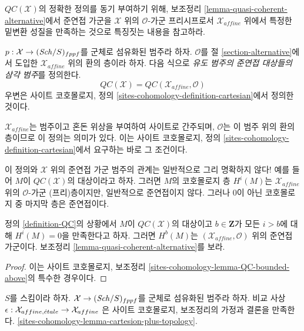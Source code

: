 \medskip\noindent
 $\mathit{QC}(\mathcal{X})$의 정확한 정의를 동기 부여하기 위해,
보조정리 \ref{lemma-quasi-coherent-alternative}에서 준연접 가군을
$\mathcal{X}$ 위의 $\mathcal{O}$-가군 프리시프로서 $\mathcal{X}_{affine}$
위에서 특정한 밑변환 성질을 만족하는 것으로 특징짓는 내용을 참고하라.

\begin{definition}
\label{definition-QC}
$p : \mathcal{X} \to (\mathit{Sch}/S)_{fppf}$를 군체로 섬유화된 범주라 하자.
$\mathcal{O}$를 절 \ref{section-alternative}에서 도입한
$\mathcal{X}_{affine}$ 위의 환의 층이라 하자. 다음 식으로
{\it 유도 범주의 준연접 대상들의 삼각 범주}를 정의한다.
$$
\mathit{QC}(\mathcal{X}) = \mathit{QC}(\mathcal{X}_{affine}, \mathcal{O})
$$
우변은 사이트 코호몰로지, 정의
\ref{sites-cohomology-definition-cartesian}에서 정의한 것이다.
\end{definition}

\noindent
 $\mathcal{X}_{affine}$는 범주이고 혼돈 위상을 부여하여 사이트로
간주되며, $\mathcal{O}$는 이 범주 위의 환의 층이므로 이 정의는 의미가
있다. 이는 사이트 코호몰로지, 정의
\ref{sites-cohomology-definition-cartesian}에서 요구하는 바로 그 조건이다.

\medskip\noindent
이 정의와 $\mathcal{X}$ 위의 준연접 가군 범주의 관계는 일반적으로
그리 명확하지 않다! 예를 들어 $M$이 $\mathit{QC}(\mathcal{X})$의
대상이라고 하자. 그러면 $M$의 코호몰로지 층 $H^i(M)$는
$\mathcal{X}_{affine}$ 위의 $\mathcal{O}$-가군 (프리)층이지만,
일반적으로 준연접이지 않다. 그러나 0이 아닌 코호몰로지 중 마지막
층은 준연접이다.

\begin{lemma}
\label{lemma-QC-bounded-above}
정의 \ref{definition-QC}의 상황에서 $M$이 $\mathit{QC}(\mathcal{X})$의
대상이고 $b \in \mathbf{Z}$가 모든 $i > b$에 대해 $H^i(M) = 0$을
만족한다고 하자. 그러면 $H^b(M)$는
$(\mathcal{X}_{affine}, \mathcal{O})$ 위의 준연접 가군이다. 보조정리
\ref{lemma-quasi-coherent-alternative}를 보라.
\end{lemma}

\begin{proof}
이는 사이트 코호몰로지, 보조정리
\ref{sites-cohomology-lemma-QC-bounded-above}의 특수한 경우이다.
\end{proof}

\begin{lemma}
\label{lemma-QC-compare}
$S$를 스킴이라 하자. $\mathcal{X} \to (\mathit{Sch}/S)_{fppf}$를 군체로
섬유화된 범주라 하자. 비교 사상
$\epsilon : \mathcal{X}_{affine, {\acute{e}tale}} \to \mathcal{X}_{affine}$
은 사이트 코호몰로지, 보조정리의 가정과 결론을 만족한다.
\ref{sites-cohomology-lemma-cartesion-plus-topology}.
\end{lemma}

